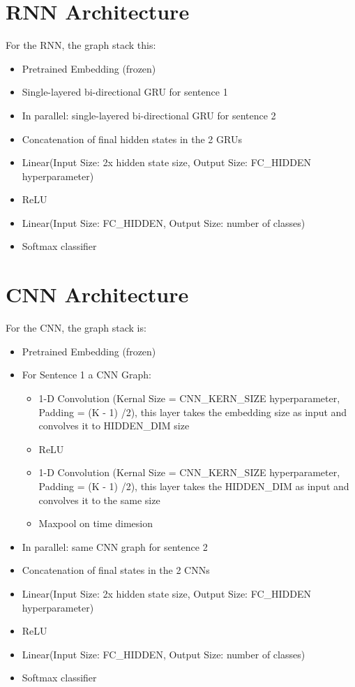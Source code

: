 \documentclass[a4paper,10pt]{article}
\begin{document}
\section{RNN Architecture}
For the RNN, the graph stack this:
\begin{itemize}
\item Pretrained Embedding (frozen)
\item Single-layered bi-directional GRU for sentence 1
\item In parallel: single-layered bi-directional GRU for sentence 2
\item Concatenation of final hidden states in the 2 GRUs
\item Linear(Input Size: 2x hidden state size, Output Size: FC\_HIDDEN hyperparameter)
\item ReLU
\item Linear(Input Size: FC\_HIDDEN, Output Size: number of classes)
\item Softmax classifier
\end{itemize}

\section{CNN Architecture}
For the CNN, the graph stack is:
\begin{itemize}
\item Pretrained Embedding (frozen)
\item For Sentence 1 a CNN Graph:
\begin{itemize}
	\item 1-D Convolution (Kernal Size = CNN\_KERN\_SIZE hyperparameter, Padding = (K - 1) /2), this layer takes the embedding size as input and convolves it to HIDDEN\_DIM size
	\item ReLU
	\item 1-D Convolution (Kernal Size = CNN\_KERN\_SIZE hyperparameter, Padding = (K - 1) /2), this layer takes the HIDDEN\_DIM as input and convolves it to the same size 
	\item Maxpool on time dimesion
\end{itemize}
\item In parallel: same CNN graph for sentence 2
\item Concatenation of final states in the 2 CNNs
\item Linear(Input Size: 2x hidden state size, Output Size: FC\_HIDDEN hyperparameter)
\item ReLU
\item Linear(Input Size: FC\_HIDDEN, Output Size: number of classes)
\item Softmax classifier
\end{itemize}
\end{document}
